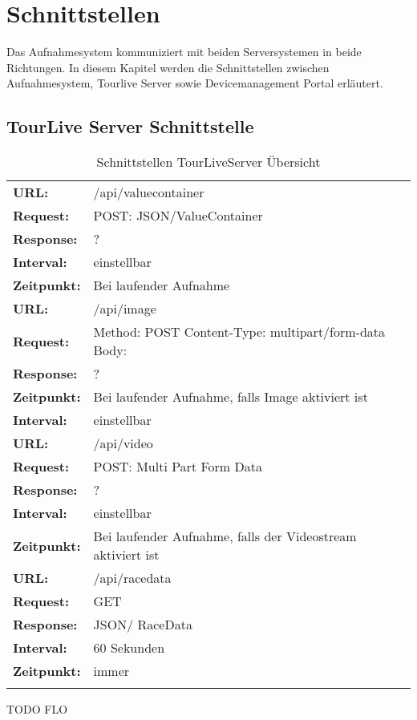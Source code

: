 \chapter{Schnittstellen}

Das Aufnahmesystem kommuniziert mit beiden Serversystemen in beide Richtungen. In diesem Kapitel werden die Schnittstellen zwischen Aufnahmesystem,  Tourlive Server sowie Devicemanagement Portal erläutert.
 

\section{TourLive Server Schnittstelle}

{\renewcommand{\arraystretch}{1.5}%
    \begin{longtable}{ p{2.5cm}  p{10cm}}

	\textbf{URL:} & /api/valuecontainer \\
	\textbf{Request:} & POST: JSON/ValueContainer \\
	\textbf{Response:} & ?  \\
	\textbf{Interval:} & einstellbar \\
	\textbf{Zeitpunkt:} & Bei laufender Aufnahme \\ 
\hline
\hline
	\textbf{URL:} & /api/image \\
	\textbf{Request:} & Method: POST
		\newline Content-Type: multipart/form-data
		\newline Body: \\
	\textbf{Response:} & ?  \\
	\textbf{Zeitpunkt:} & Bei laufender Aufnahme, falls Image aktiviert ist \\ 
	\textbf{Interval:} & einstellbar \\
\hline
\hline
	\textbf{URL:} & /api/video \\
	\textbf{Request:} & POST: Multi Part Form Data \\
	\textbf{Response:} & ?  \\
	\textbf{Interval:} & einstellbar \\
	\textbf{Zeitpunkt:} & Bei laufender Aufnahme, falls der Videostream aktiviert ist \\ 
\hline
\hline
	\textbf{URL:} & /api/racedata \\
	\textbf{Request:} & GET \\
	\textbf{Response:} & JSON/ RaceData  \\
	\textbf{Interval:} & 60 Sekunden \\
	\textbf{Zeitpunkt:} & immer \\ 
\hline
\hline 
\caption{Schnittstellen TourLiveServer Übersicht}
\end{longtable} }
TODO FLO

